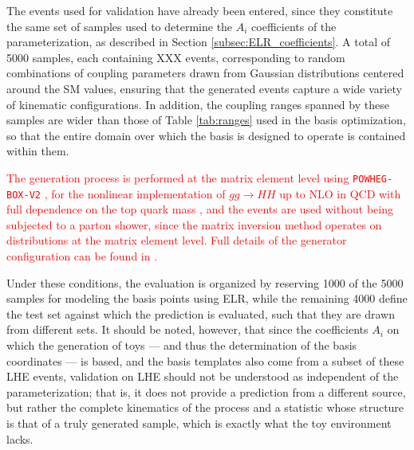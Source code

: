 The events used for validation have already been entered, since they constitute the same set of samples used to determine the $A_i$ coefficients of the parameterization, as described in Section \ref{subsec:ELR_coefficients}. A total of 5000 samples, each containing XXX events, corresponding to random combinations of coupling parameters drawn from Gaussian distributions centered around the SM values, ensuring that the generated events capture a wide variety of kinematic configurations. In addition, the coupling ranges spanned by these samples are wider than those of Table \ref{tab:ranges} used in the basis optimization, so that the entire domain over which the basis is designed to operate is contained within them.

\textcolor{red}{
The generation process is performed at the matrix element level using \texttt{POWHEG-BOX-V2} \cite{powheg1,powheg2,powheg3}, for the nonlinear implementation of $gg\to HH$ up to NLO in QCD with full dependence on the top quark mass \cite{HEFTpowheg}, and the events are used without being subjected to a parton shower, since the matrix inversion method operates on distributions at the matrix element level. Full details of the generator configuration can be found in \cite{HHReweighting}.}

Under these conditions, the evaluation is organized by reserving 1000 of the 5000 samples for modeling the basis points using ELR, while the remaining 4000 define the test set against which the prediction is evaluated, such that they are drawn from different sets. It should be noted, however, that since the coefficients $A_i$ on which the generation of toys — and thus the determination of the basis coordinates — is based, and the basis templates also come from a subset of these LHE events, validation on LHE should not be understood as independent of the parameterization; that is, it does not provide a prediction from a different source, but rather the complete kinematics of the process and a statistic whose structure is that of a truly generated sample, which is exactly what the toy environment lacks.\\


